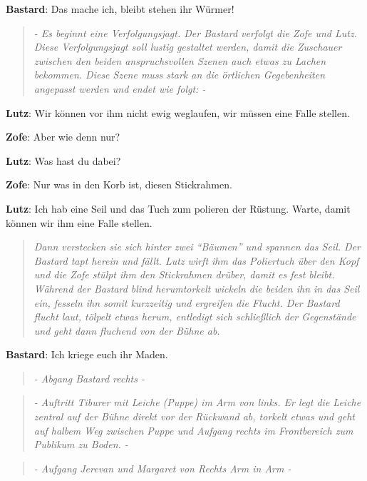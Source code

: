 \documentclass[a5paper,7pt, twocolumn]{book}
\begin{document}
\textbf{Bastard}: Das mache ich, bleibt stehen ihr Würmer!

\begin{quote}
  \textit{- Es beginnt eine Verfolgungsjagt. Der Bastard verfolgt die Zofe und Lutz. Diese Verfolgungsjagt soll lustig gestaltet werden, damit die Zuschauer zwischen den beiden anspruchsvollen Szenen auch etwas zu Lachen bekommen.
Diese Szene muss stark an die örtlichen Gegebenheiten angepasst werden und endet wie folgt: -}
 \end{quote}


\textbf{Lutz}: Wir können vor ihm nicht ewig weglaufen, wir müssen eine Falle stellen.

\textbf{Zofe}: Aber wie denn nur?

\textbf{Lutz}: Was hast du dabei?

\textbf{Zofe}: Nur was in den Korb ist, diesen Stickrahmen.

\textbf{Lutz}: Ich hab eine Seil und das Tuch zum polieren der Rüstung. Warte, damit können wir ihm eine Falle stellen.

\begin{quote}
  \textit{Dann verstecken sie sich hinter zwei “Bäumen” und spannen das Seil. Der Bastard tapt herein und fällt. Lutz wirft ihm das Poliertuch über den Kopf und die Zofe stülpt ihm den Stickrahmen drüber, damit es fest bleibt. Während der Bastard blind herumtorkelt wickeln die beiden ihn in das Seil ein, fesseln ihn somit kurzzeitig und ergreifen die Flucht.
Der Bastard flucht laut, tölpelt etwas herum, entledigt sich schließlich der Gegenstände und geht dann fluchend von der Bühne ab.
}
 \end{quote}

\textbf{Bastard}: Ich kriege euch ihr Maden.


\begin{quote}
  \textit{- Abgang Bastard rechts -
}
 \end{quote}

\begin{quote}
  \textit{- Auftritt Tiburer mit Leiche (Puppe) im Arm von links. Er legt die Leiche zentral auf der Bühne direkt vor der Rückwand ab, torkelt etwas und geht auf halbem Weg zwischen Puppe und Aufgang rechts im Frontbereich zum Publikum zu Boden. -
}
 \end{quote}

\begin{quote}
  \textit{- Aufgang Jerevan und Margaret von Rechts Arm in Arm -
}
 \end{quote}
\end{document}
